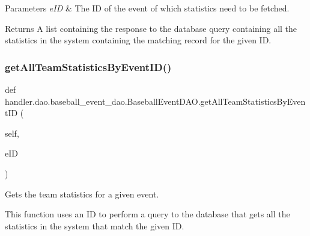 \begin{DoxyParams}{Parameters}
{\em e\+ID} & The ID of the event of which statistics need to be fetched.\\
\hline
\end{DoxyParams}
\begin{DoxyReturn}{Returns}
A list containing the response to the database query containing all the statistics in the system containing the matching record for the given ID. 
\end{DoxyReturn}
\mbox{\label{classhandler_1_1dao_1_1baseball__event__dao_1_1_baseball_event_d_a_o_a98657990993ba362f863b43e9b9d41af}} 
\subsubsection{\texorpdfstring{get\+All\+Team\+Statistics\+By\+Event\+I\+D()}{getAllTeamStatisticsByEventID()}}
{\footnotesize\ttfamily def handler.\+dao.\+baseball\+\_\+event\+\_\+dao.\+Baseball\+Event\+D\+A\+O.\+get\+All\+Team\+Statistics\+By\+Event\+ID (\begin{DoxyParamCaption}\item[{}]{self,  }\item[{}]{e\+ID }\end{DoxyParamCaption})}



Gets the team statistics for a given event. 

This function uses an ID to perform a query to the database that gets all the statistics in the system that match the given ID.


